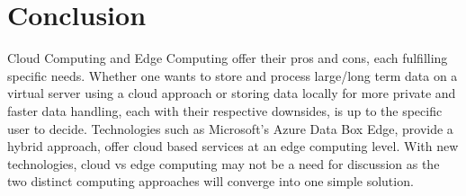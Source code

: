 \documentclass[conference]{IEEEtran}
\begin{document}
{\section{Conclusion}
Cloud Computing and Edge Computing offer their pros and cons, each fulfilling specific needs. Whether one wants to store and process large/long term data on a virtual server using a cloud approach or storing data locally for more private and faster data handling, each with their respective downsides, is up to  the specific user to decide. Technologies such as Microsoft's Azure Data Box Edge, provide a hybrid approach, offer cloud based services at an edge computing level. With new technologies, cloud vs edge computing may not be a need for discussion as the two distinct computing approaches will converge into one simple solution. 




}
\end{document}
